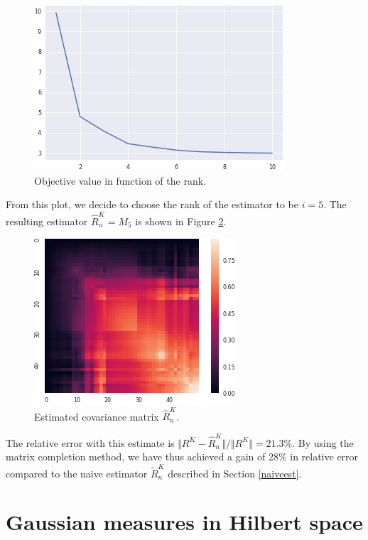 \documentclass[10pt, a4paper]{report}
\theoremstyle{definition}
\theoremstyle{remark}
\begin{document}
\begin{figure}
\centering
\includegraphics[width=0.7\linewidth]{Code/images/24/obvals}
\caption{Objective value in function of the rank.}
\label{fig:obvals}
\end{figure}
From this plot, we decide to choose the rank of the estimator to be $i=5$. The resulting estimator $\hat{R}_n^K = M_5$  is shown in Figure \ref{fig:estcov}.
\begin{figure}
\centering
\includegraphics[width=0.7\linewidth]{Code/images/24/estcov}
\caption{Estimated covariance matrix $\hat{R}_n^K$.}
\label{fig:estcov}
\end{figure}
The relative error with this estimate is $\Vert R^K - \hat{R}_n^K\Vert / \Vert R^K \Vert = 21.3\%$. By using the matrix completion method, we have thus achieved a gain of 28\% in relative error compared to the naive estimator $\tilde{R}_n^K$ described in Section \ref{naiveest}.


\chapter{Gaussian measures in Hilbert space}
\end{document}

